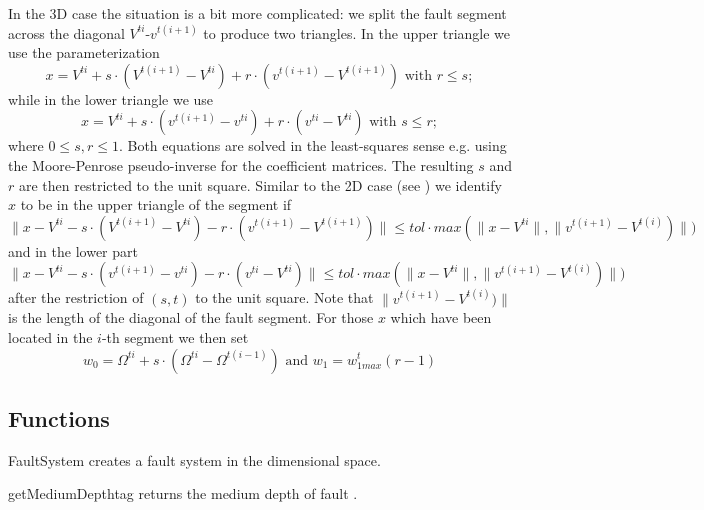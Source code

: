 In the 3D case the situation is a bit more complicated: we split the fault
segment across the diagonal $V^{ti}$-$v^{t(i+1)}$ to produce two triangles.
In the upper triangle we use the parameterization 
\begin{equation}
x= V^{ti} + s \cdot (V^{t(i+1)}-V^{ti})  + r \cdot (v^{t(i+1)}-V^{t(i+1)})
\mbox{ with } r \le s; 
\label{eq:2D line 4}
\end{equation}
while in the lower triangle we use
\begin{equation}
x= V^{ti} +  s \cdot (v^{t(i+1)}-v^{ti}) + r \cdot (v^{ti}-V^{ti})
\mbox{ with } s \le r; 
\label{eq:2D line 4b}
\end{equation}
where $0\le s,r \le 1$. Both equations are solved in the least-squares sense
e.g. using the Moore-Penrose pseudo-inverse for the coefficient matrices.
The resulting $s$ and $r$ are then restricted to the unit square. Similar to
the 2D case (see ) we identify $x$ to be in the upper
triangle of the segment if
\begin{equation}
\|x- V^{ti} - s \cdot (V^{t(i+1)}-V^{ti})  - r \cdot (v^{t(i+1)}-V^{t(i+1)}) \|
\le tol \cdot  max(\|x-V^{ti} \|,\|v^{t(i+1)}-V^{t(i)})\|) 
\label{eq:2D line 4c}
\end{equation}
and in the lower part
\begin{equation}
\|x-V^{ti} -  s \cdot (v^{t(i+1)}-v^{ti}) - r \cdot (v^{ti}-V^{ti}) \|
\le tol \cdot  max(\|x-V^{ti} \|,\|v^{t(i+1)}-V^{t(i)})\|)  
\label{eq:2D line 4d}
\end{equation}
after the restriction of $(s,t)$ to the unit square.
Note that $\|v^{t(i+1)}-V^{t(i)})\|$ is the length of the diagonal of the
fault segment. For those $x$ which have been located in the $i$-th segment we
then set
\begin{equation}
w_{0}=\Omega^{ti}+s \cdot (\Omega^{ti}-\Omega^{t(i-1)})
\mbox{ and }
w_{1}=w^t_{1max} (r-1) 
\label{eq:2D line 5}
\end{equation}

\subsection{Functions}

\begin{classdesc}{FaultSystem}{}
creates a fault system in the  dimensional space.
\end{classdesc}

\begin{methoddesc}[FaultSystem]{getMediumDepth}{tag}
returns the medium depth of fault .
\end{methoddesc}

